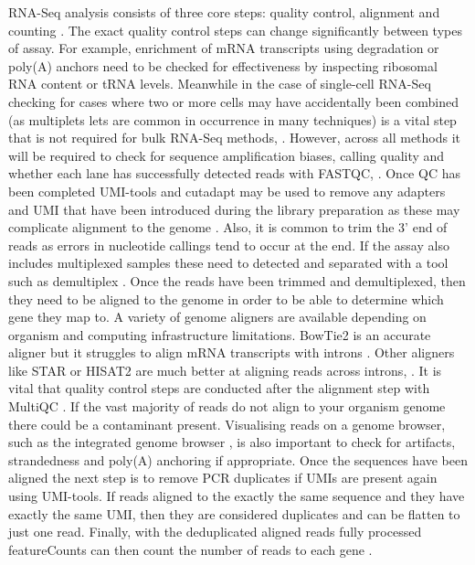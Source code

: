 \documentclass[../main.tex]{subfiles}
\begin{document}
RNA-Seq analysis consists of three core steps: quality control, alignment and counting \parencite{CostaSilva2022}. 
The exact quality control steps can change significantly between types of assay.
For example, enrichment of mRNA transcripts using degradation or poly(A) anchors need to be checked for effectiveness by inspecting ribosomal RNA content or tRNA levels.
Meanwhile in the case of single-cell RNA-Seq checking for cases where two or more cells may have accidentally been combined (as multiplets lets are common in occurrence in many techniques) is a vital step that is not required for bulk RNA-Seq methods, \parencite{Zheng2017}.
However, across all methods it will be required to check for sequence amplification biases, calling quality and whether each lane has successfully detected reads with FASTQC, \parencite{Andrews2010}.
Once QC has been completed UMI-tools and cutadapt may be used to remove any adapters and UMI that have been introduced during the library preparation as these may complicate alignment to the genome \parencite{Smith2017,Martin2011}. 
Also, it is common to trim the 3' end of reads as errors in nucleotide callings tend to occur at the end. 
If the assay also includes multiplexed samples these need to detected and separated with a tool such as demultiplex \parencite{Laros2018}. 
Once the reads have been trimmed and demultiplexed, then they need to be aligned to the genome in order to be able to determine which gene they map to.
A variety of genome aligners are available depending on organism and computing infrastructure limitations.  
BowTie2 is an accurate aligner but it struggles to align mRNA transcripts with introns \parencite{Langmead2012}.
Other aligners like STAR or HISAT2 are much better at aligning reads across introns, \parencite{Dobin2013, Kim2019}. 
It is vital that quality control steps are conducted after the alignment step with MultiQC \parencite{Ewels2016}.
If the vast majority of reads do not align to your organism genome there could be a contaminant present. 
Visualising reads on a genome browser, such as the integrated genome browser \parencite{Freese2016}, is also important to check for artifacts, strandedness and poly(A) anchoring if appropriate. 
Once the sequences have been aligned the next step is to remove PCR duplicates if UMIs are present again using UMI-tools. 
If reads aligned to the exactly the same sequence and they have exactly the same UMI, then they are considered duplicates and can be flatten to just one read. 
Finally, with the deduplicated aligned reads fully processed featureCounts can then count the number of reads to each gene \parencite{Liao2014,Conesa2016}.
\end{document}
